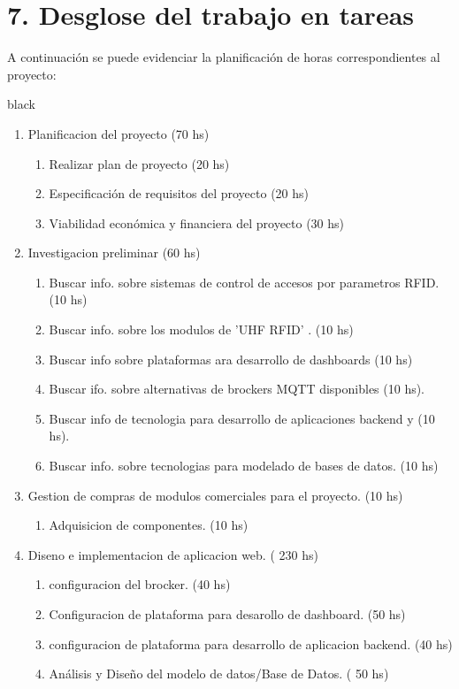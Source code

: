 \documentclass[
11pt, %
codirector, %
]{charter}
\begin{document}
\section{7. Desglose del trabajo en tareas}
\label{sec:wbs}
A continuación se puede evidenciar la planificación de horas correspondientes al proyecto:
\begin{consigna}{black}
\begin{enumerate}
\item Planificacion del proyecto (70 hs)
	\begin{enumerate}
	\item Realizar plan de proyecto (20 hs)
	\item Especificación de requisitos del proyecto (20 hs)
	\item Viabilidad económica y financiera del proyecto (30 hs)
	\end{enumerate}
\item  Investigacion preliminar (60 hs)
	\begin{enumerate}
	\item Buscar info. sobre sistemas de control de accesos por parametros RFID. (10 hs)
	\item Buscar info. sobre los modulos de 'UHF RFID' . (10 hs)
	\item Buscar info sobre plataformas ara desarrollo de dashboards  (10 hs)
	\item Buscar ifo. sobre alternativas de brockers MQTT disponibles  (10 hs).
	\item Buscar info de tecnologia para desarrollo de aplicaciones backend y  (10 hs). 
	\item Buscar info. sobre tecnologias para modelado de bases de datos. (10 hs)
	\end{enumerate}
\item Gestion de compras de modulos comerciales para el proyecto. (10 hs)
	\begin{enumerate}
	\item Adquisicion de componentes. (10 hs)
	\end{enumerate}
\item Diseno e implementacion de aplicacion web. ( 230 hs)
	\begin{enumerate}
	\item configuracion del brocker. (40 hs)
	\item Configuracion de plataforma para desarollo de dashboard. (50 hs)
	\item configuracion de plataforma para desarrollo de aplicacion backend. (40 hs)
	\item Análisis y Diseño del modelo de datos/Base de Datos. ( 50 hs)

\end{enumerate}
\end{enumerate}
\end{consigna}
\end{document}
